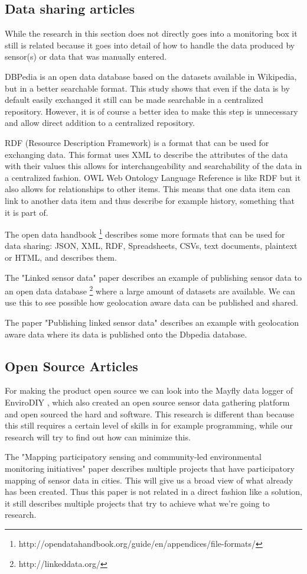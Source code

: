 \documentclass[conference]{IEEEtran}
\begin{document}
\subsection{Data sharing articles}
While the research in this section does not directly goes into a monitoring box it still is related because it goes into detail of how to handle the data produced by sensor(s) or data that was manually entered.
\par
DBPedia \cite{auer2007dbpedia}  is an open data database based on the datasets available in Wikipedia, but in a better searchable format. This study shows that even if the data is by default easily exchanged it still can be made searchable in a centralized repository. However, it is of course a better idea to make this step is unnecessary and allow direct addition to a centralized repository.
\par
RDF (Resource Description Framework) is a format that can be used for exchanging data. \cite{lassila1998resource}  This format uses XML to describe the attributes of the data with their values this allows for interchangeability and searchability of the data in a centralized fashion.
OWL Web Ontology Language Reference \cite{mcguinness2004owl}  is like RDF but it also allows for relationships to other items. This means that one data item can link to another data item and thus describe for example history, something that it is part of.
\par
The open data handbook \footnote{http://opendatahandbook.org/guide/en/appendices/file-formats/} describes some more formats that can be used for data sharing: JSON, XML, RDF, Spreadsheets, CSVs, text documents, plaintext or HTML, and describes them.
\par
The "Linked sensor data" paper describes an example of publishing sensor data to an open data database \footnote{http://linkeddata.org/} where a large amount of datasets are available. We can use this to see possible how geolocation aware data can be published and shared.
\par
The paper "Publishing linked sensor data" describes an example with geolocation aware data where its data is published onto the Dbpedia database. \cite{barnaghi2010publishing} 
\subsection{Open Source Articles}
For making the product open source we can look into the Mayfly data logger of EnviroDIY \cite{arscott2017publishing},  which also created an open source sensor data gathering platform and open sourced the hard and software. This research is different than because this still requires a certain level of skills in for example programming, while our research will try to find out how can minimize this.
\par
The "Mapping participatory sensing and community-led environmental monitoring initiatives" \cite{balestrinideliverable} paper describes multiple projects that have participatory mapping of sensor data in cities. This will give us a broad view of what already has been created. Thus this paper is not related in a direct fashion like a solution, it still describes multiple projects that try to achieve what we're going to research.
\end{document}
